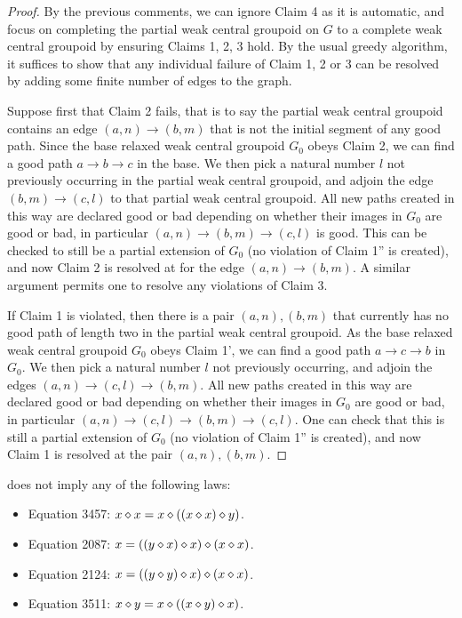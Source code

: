\begin{proof}
  By the previous comments, we can ignore Claim 4 as it is automatic, and focus on completing the partial weak central groupoid on $G$ to a complete weak central groupoid by ensuring Claims 1, 2, 3 hold. By the usual greedy algorithm, it suffices to show that any individual failure of Claim 1, 2 or 3 can be resolved by adding some finite number of edges to the graph.

  Suppose first that Claim 2 fails, that is to say the partial weak central groupoid contains an edge $(a,n) \to (b,m)$ that is not the initial segment of any good path. Since the base relaxed weak central groupoid $G_0$ obeys Claim 2, we can find a good path $a \to b \to c$ in the base. We then pick a natural number $l$ not previously occurring in the partial weak central groupoid, and adjoin the edge $(b,m) \to (c,l)$ to that partial weak central groupoid. All new paths created in this way are declared good or bad depending on whether their images in $G_0$ are good or bad, in particular $(a,n) \to (b,m) \to (c,l)$ is good. This can be checked to still be a partial extension of $G_0$ (no violation of Claim 1'' is created), and now Claim 2 is resolved at for the edge $(a,n) \to (b,m)$. A similar argument permits one to resolve any violations of Claim 3.

  If Claim 1 is violated, then there is a pair $(a,n), (b,m)$ that currently has no good path of length two in the partial weak central groupoid. As the base relaxed weak central groupoid $G_0$ obeys Claim 1', we can find a good path $a \to c \to b$ in $G_0$. We then pick a natural number $l$ not previously occurring, and adjoin the edges $(a,n) \to (c,l) \to (b,m)$. All new paths created in this way are declared good or bad depending on whether their images in $G_0$ are good or bad, in particular $(a,n) \to (c,l) \to (b,m) \to (c,l)$. One can check that this is still a partial extension of $G_0$ (no violation of Claim 1'' is created), and now Claim 1 is resolved at the pair $(a,n), (b,m)$.
\end{proof}

\begin{theorem}\label{1485-refutes}\leanok{}
   does not imply any of the following laws:
  \begin{itemize}
   \item Equation 3457: $x \diamond x = x \diamond ((x \diamond x) \diamond y)$.
   \item Equation 2087: $x = ((y \diamond x) \diamond x) \diamond (x \diamond x)$.
   \item Equation 2124: $x = ((y \diamond y) \diamond x) \diamond (x \diamond x)$.
   \item Equation 3511: $x \diamond y = x \diamond ((x \diamond y) \diamond x)$.
  \end{itemize}
\end{theorem}

